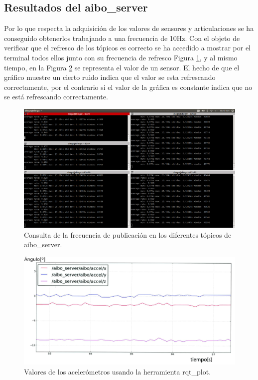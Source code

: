 \documentclass[12pt,a4paper,final,twoside]{book}
\begin{document}
\subsection{Resultados del aibo{\_}server}

Por lo que respecta la adquisición de los valores de sensores y articulaciones se ha conseguido obtenerlos trabajando a una frecuencia de 10Hz. Con el objeto de verificar que el refresco de los tópicos es correcto se ha accedido a mostrar por el terminal todos ellos junto con su frecuencia de refresco Figura \ref{fig:getT}, y al mismo tiempo, en la Figura \ref{fig:addacc} se representa el valor de un sensor. El hecho de que el gráfico muestre un cierto ruido indica que el valor se esta refrescando correctamente, por el contrario si el valor de la gráfica es constante indica que no se está refrescando correctamente.

\begin{figure}[H]
    \includegraphics[scale=0.3]{images/getTopics.png}
	 \caption{Consulta de la frecuencia de publicación en los diferentes tópicos de aibo{\_}server.}
  \label{fig:getT}
\end{figure}

\begin{figure}[H]
	\centering
    \includegraphics[scale=0.28]{images/accel.jpg}
	 \caption{Valores de los acelerómetros usando la herramienta rqt{\_}plot.}
  \label{fig:addacc}
\end{figure}
\end{document}
